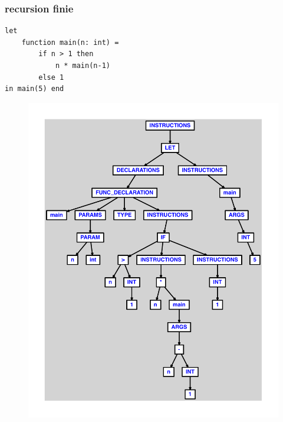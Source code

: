 \documentclass{article}
\begin{document}
\subsubsection{recursion finie}
\begin{lstlisting}
let
	function main(n: int) =
		if n > 1 then
			n * main(n-1)
		else 1
in main(5) end
\end{lstlisting}
\newpage
\begin{figure}[H]
\centering
\includegraphics[max width=\textwidth]{ast/ast_246.pdf}
\end{figure}
\newpage
\end{document}
